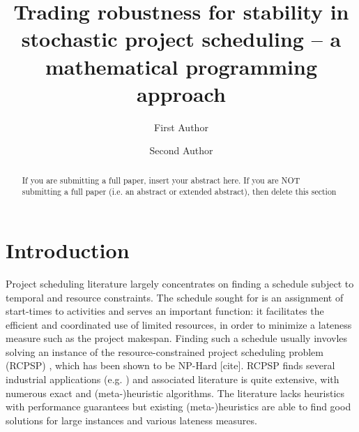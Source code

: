	\newcommand{\xE}{\mathcal{E}}
	\newcommand{\xS}{\mathcal{S}}
	\newcommand{\xX}{\boldsymbol{X}}
	\newtheorem{edit}{Edit}	
	
	
	
	\title{Trading robustness for stability in stochastic project scheduling 
			-- a mathematical programming approach}
	
	\subtitle{}
	
	\author{First Author         \and
	        Second Author %
	}
	
	
	\maketitle
	
	\begin{abstract}
	If you are submitting a full paper, insert your abstract here.
	If you are NOT submitting a full paper (i.e. an abstract or extended abstract), then delete this section
	\end{abstract}
	
	\section{Introduction}
	
	
	Project scheduling literature largely concentrates on finding a schedule
	subject to temporal and resource constraints.
	The schedule sought for is an assignment of start-times to activities
	and serves an important function: 
	it facilitates the efficient and coordinated use of limited resources,
	in order to minimize a lateness measure such as the project makespan.
	Finding such a schedule usually invovles solving an instance
	of the resource-constrained project scheduling problem (RCPSP) \cite{hartmann2010survey},
	which has been shown to be \textsc{NP}-Hard [cite].
	RCPSP finds several industrial applications (e.g. \cite{bomsdorf2008model,bartels2009scheduling})
	and associated literature is quite extensive,
	with numerous exact and (meta-)heuristic algorithms.
	The literature lacks heuristics with performance guarantees but existing 
	(meta-)heuristics are able to find good solutions for large instances and various lateness measures.

